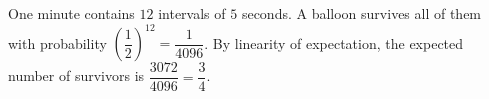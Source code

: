 One minute contains $12$ intervals of $5$ seconds. A balloon survives all of them with probability $\left(\dfrac12\right)^{12}=\dfrac1{4096}$. By linearity of expectation, the expected number of survivors is $\dfrac{3072}{4096}=\boxed{\dfrac34}$.
